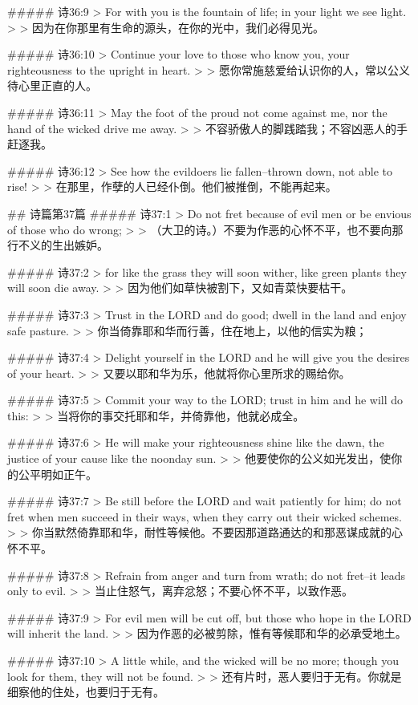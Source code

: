 ##### 诗36:9
> For with you is the fountain of life; in your light we see light.
>
> 因为在你那里有生命的源头，在你的光中，我们必得见光。


##### 诗36:10
> Continue your love to those who know you, your righteousness to the upright in heart.
>
> 愿你常施慈爱给认识你的人，常以公义待心里正直的人。


##### 诗36:11
> May the foot of the proud not come against me, nor the hand of the wicked drive me away.
>
> 不容骄傲人的脚践踏我；不容凶恶人的手赶逐我。


##### 诗36:12
> See how the evildoers lie fallen--thrown down, not able to rise!
>
> 在那里，作孽的人已经仆倒。他们被推倒，不能再起来。


## 诗篇第37篇
##### 诗37:1
> Do not fret because of evil men or be envious of those who do wrong;
>
> （大卫的诗。）不要为作恶的心怀不平，也不要向那行不义的生出嫉妒。


##### 诗37:2
> for like the grass they will soon wither, like green plants they will soon die away.
>
> 因为他们如草快被割下，又如青菜快要枯干。


##### 诗37:3
> Trust in the LORD and do good; dwell in the land and enjoy safe pasture.
>
> 你当倚靠耶和华而行善，住在地上，以他的信实为粮；


##### 诗37:4
> Delight yourself in the LORD and he will give you the desires of your heart.
>
> 又要以耶和华为乐，他就将你心里所求的赐给你。


##### 诗37:5
> Commit your way to the LORD; trust in him and he will do this:
>
> 当将你的事交托耶和华，并倚靠他，他就必成全。


##### 诗37:6
> He will make your righteousness shine like the dawn, the justice of your cause like the noonday sun.
>
> 他要使你的公义如光发出，使你的公平明如正午。


##### 诗37:7
> Be still before the LORD and wait patiently for him; do not fret when men succeed in their ways, when they carry out their wicked schemes.
>
> 你当默然倚靠耶和华，耐性等候他。不要因那道路通达的和那恶谋成就的心怀不平。


##### 诗37:8
> Refrain from anger and turn from wrath; do not fret--it leads only to evil.
>
> 当止住怒气，离弃忿怒；不要心怀不平，以致作恶。


##### 诗37:9
> For evil men will be cut off, but those who hope in the LORD will inherit the land.
>
> 因为作恶的必被剪除，惟有等候耶和华的必承受地土。


##### 诗37:10
> A little while, and the wicked will be no more; though you look for them, they will not be found.
>
> 还有片时，恶人要归于无有。你就是细察他的住处，也要归于无有。


